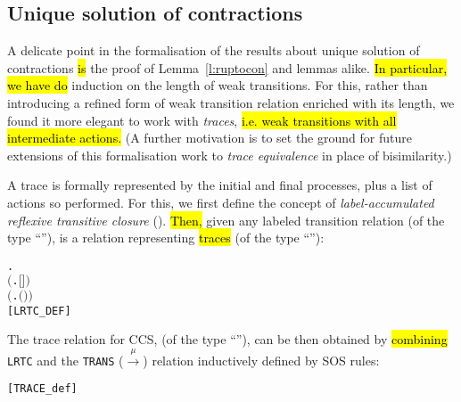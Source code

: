 \subsection{Unique solution of contractions}

A delicate point in the formalisation of the results about unique solution of
contractions \hl{is} the proof of Lemma~\ref{l:ruptocon} and lemmas alike.
\hl{In particular, we have do} induction on the length of weak transitions.
For this, rather than introducing a refined form of weak transition relation
enriched with its length, we found it more elegant to work with
\emph{traces}, \hl{i.e. weak transitions with all intermediate actions.}
(A further motivation is to set the ground for future extensions of this
formalisation work to \emph{trace equivalence} in place of bisimilarity.)

A trace is formally represented by the initial and final processes, plus
a list of actions so performed.
For this, we first define the concept of \emph{label-accumulated reflexive transitive closure}
 ().
\hl{Then,} given any labeled transition relation  (of the type
``''),  is
a relation representing \hl{traces} (of the type
``''):
\begin{alltt}
        \HOLTokenDefEquality{}
     \HOLSymConst{\HOLTokenForall{}}.
         \ensuremath{(}\HOLSymConst{\HOLTokenForall{}}.   \ensuremath{[}\ensuremath{]} \ensuremath{)} \HOLSymConst{\HOLTokenConj{}}
         \ensuremath{(}\HOLSymConst{\HOLTokenForall{}}    .     \HOLSymConst{\HOLTokenConj{}}     \HOLSymConst{\HOLTokenImp{}}   \ensuremath{(}\HOLSymConst{::}\ensuremath{)} \ensuremath{)} \HOLSymConst{\HOLTokenImp{}}
            \hfill{[LRTC_DEF]}
\end{alltt}
The trace relation for CCS,  (of the
type ``''),
can be then obtained
 by \hl{combining} \texttt{LRTC} and the \texttt{TRANS}
 ($\overset{\mu}{\rightarrow}$) relation inductively defined by SOS rules:
\begin{alltt}
    \HOLTokenDefEquality{}  \hfill{[TRACE_def]}
\end{alltt}

